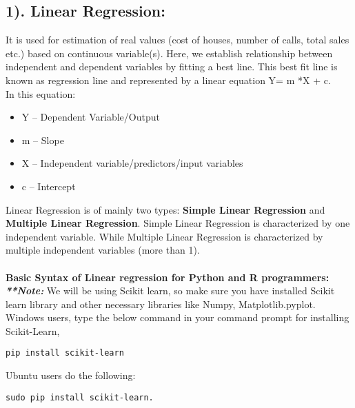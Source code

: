 \documentclass[Proceedings]{ascelike}
\begin{document}
\subsection{1). Linear Regression:}
It is used for estimation of real values (cost of houses, number of calls, total sales etc.) based on continuous variable(s). Here, we establish relationship between independent and dependent variables by fitting a best line. This best fit line is known as regression line and represented by a linear equation Y= m *X + c.\\
In this equation:
\begin{itemize}
	\item Y – Dependent Variable/Output
	\item m – Slope
	\item X – Independent variable/predictors/input variables
	\item c – Intercept
\end{itemize}

Linear Regression is of mainly two types: \textbf{Simple Linear Regression} and \textbf{Multiple Linear Regression}. Simple Linear Regression is characterized by one independent variable. 
While Multiple Linear Regression is characterized by multiple independent variables (more than 1).\\\\
\textbf{Basic Syntax of Linear regression for Python and R programmers:}\\
\textit{\textbf{**Note:}} We will be using Scikit learn, so make sure you have installed Scikit learn library and other necessary libraries like Numpy, Matplotlib.pyplot.\\
Windows users, type the below command in your command prompt for installing Scikit-Learn,
\begin{lstlisting}
pip install scikit-learn
\end{lstlisting}

Ubuntu users do the following: 
\begin{lstlisting}
sudo pip install scikit-learn.
\end{lstlisting}
\end{document}
